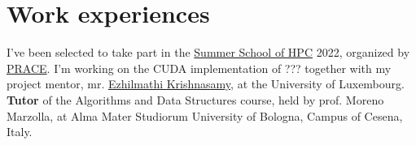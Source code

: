 \documentclass[curriculum-vitae-eng]{subfiles}
\begin{document}
	\section*{Work experiences}
	 I've been selected to take part in the \href{https://summerofhpc.prace-ri.eu/info/}{Summer School of HPC} 2022, organized by \href{https://prace-ri.eu/}{PRACE}. I'm working on the CUDA implementation of ??? together with my project mentor, mr. \href{https://wwwen.uni.lu/snt/people/ezhilmathi_krishnasamy}{Ezhilmathi Krishnasamy}, at the University of Luxembourg.\\
	
	 \textbf{Tutor} of the Algorithms and Data Structures course, held by prof. Moreno Marzolla, at Alma Mater Studiorum University of Bologna, Campus of Cesena, Italy.
\end{document}

